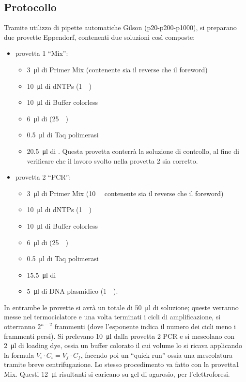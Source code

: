 \documentclass[twocolumn,a4paper,10pt]{my_report}
\begin{document}
\subsection{Protocollo}
Tramite utilizzo di pipette automatiche Gilson (p20-p200-p1000), si preparano due provette Eppendorf, contenenti due soluzioni così composte:
\begin{itemize}
	\item provetta 1 ``Mix'':
	\begin{itemize}
	    \item \SI{3}{\ul} di Primer Mix (contenente sia il reverse che il foreword)
    	\item \SI{10}{\ul} di dNTPs (\SI{1}{\milli\Molar})
    	\item \SI{10}{\ul} di Buffer colorless
    	\item \SI{6}{\ul} di (\SI{25}{\milli\Molar})
    	\item \SI{0.5}{\ul} di Taq polimerasi
    	\item \SI{20.5}{\ul} di . Questa provetta conterrà la soluzione di controllo, al fine di verificare che il lavoro svolto nella provetta 2 sia corretto.
	\end{itemize}
	\item provetta 2 ``PCR'':
	\begin{itemize}
		\item \SI{3}{\ul} di Primer Mix (\SI{10}{\micro\Molar} contenente sia il reverse che il foreword)
    	\item \SI{10}{\ul} di dNTPs (\SI{1}{\milli\Molar})
    	\item \SI{10}{\ul} di Buffer colorless
    	\item \SI{6}{\ul} di  (\SI{25}{\milli\Molar})
    	\item \SI{0.5}{\ul} di Taq polimerasi
    	\item \SI{15.5}{\ul} di 
    	\item \SI{5}{\ul} di DNA plasmidico (\SI{1}{\micro\Molar}).
	\end{itemize}
\end{itemize}
In entrambe le provette si avrà un totale di \SI{50}{\ul} di soluzione; queste verranno messe nel termociclatore e una volta terminati i cicli di amplificazione, si otterranno $2^{n-2}$ frammenti (dove l'esponente indica il numero dei cicli meno i frammenti persi).
Si prelevano \SI{10}{\ul} dalla provetta 2 PCR e si mescolano con \SI{2}{\ul} di loading dye, ossia un buffer colorato il cui volume lo si ricava applicando la formula $V_i \cdot C_i = V_f \cdot C_f$, facendo poi un ``quick run'' ossia una mescolatura tramite breve centrifugazione.
Lo stesso procedimento va fatto con la provetta1 Mix. Questi \SI{12}{\ul} risultanti si caricano su gel di agarosio, per l’elettroforesi.
\end{document}
